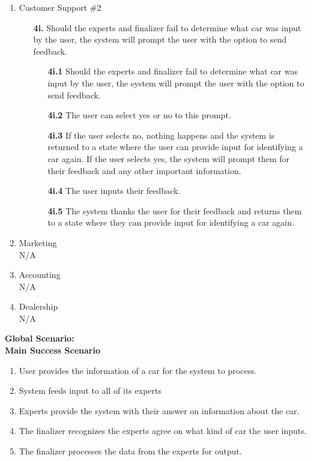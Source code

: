 \documentclass[]{article}
\begin{document}
\begin{enumerate}[label={\bf BE\arabic*.}]
\begin{enumerate}[label={\bf VP\arabic*.}]
\begin{enumerate}
		\end{enumerate}
		\item Customer Support \#2
		\begin{enumerate}
			\color{red}
			\item[\textbf{4i.}] Should the experts and finalizer fail to determine what car was input by the user, the system will prompt the user with the option to send feedback.
			\begin{enumerate}
				\item[\textbf{4i.1}] Should the experts and finalizer fail to determine what car was input by the user, the system will prompt the user with the option to send feedback.
				\item[\textbf{4i.2}] The user can select yes or no to this prompt.
				\item[\textbf{4i.3}] If the user selects no, nothing happens and the system is returned to a state where the user can provide input for identifying a car again. If the user selects yes, the system will prompt them for their feedback and any other important information.
				\item[\textbf{4i.4}] The user inputs their feedback.
				\item[\textbf{4i.5}] The system thanks the user for their feedback and returns them to a state where they can provide input for identifying a car again.
			\end{enumerate}
		\end{enumerate}
		\item Marketing\\
		N/A
		\item Accounting\\
		N/A
		\item Dealership\\
		N/A
		\end{enumerate}
		{\bf Global Scenario:}\\
		\textbf{Main Success Scenario}
		\begin{enumerate}[label={\bf \arabic*.}]
			\color{red}
			\item User provides the information of a car for the system to process.
			\item System feeds input to all of its experts
			\item Experts provide the system with their answer on information about the car.
			\item The finalizer recognizes the experts agree on what kind of car the user inputs.
			\item The finalizer processes the data from the experts for output.

\end{enumerate}
\end{enumerate}
\end{document}
